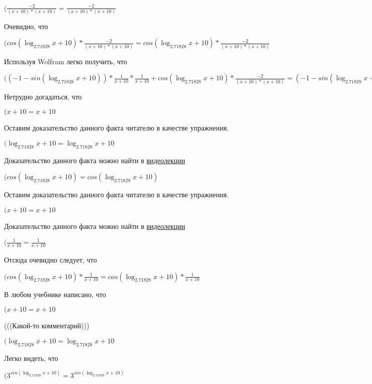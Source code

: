 \documentclass[12pt,a4paper,fleqn]{article}
\theoremstyle{definition}
\begin{document}
$(\frac{ -2 }{( x  +  10 ) * ( x  +  10 )}
 = \frac{ -2 }{( x  +  10 ) * ( x  +  10 )}
$

Очевидно, что

$(cos(\log_{ 2.71828 }{ x  +  10 }) * \frac{ -2 }{( x  +  10 ) * ( x  +  10 )}
 = cos(\log_{ 2.71828 }{ x  +  10 }) * \frac{ -2 }{( x  +  10 ) * ( x  +  10 )}
$

Используя Wolfram легко получить, что

$(( -1  - sin(\log_{ 2.71828 }{ x  +  10 })) * \frac{ 1 }{ x  +  10 }
 * \frac{ 1 }{ x  +  10 }
 + cos(\log_{ 2.71828 }{ x  +  10 }) * \frac{ -2 }{( x  +  10 ) * ( x  +  10 )}
 = ( -1  - sin(\log_{ 2.71828 }{ x  +  10 })) * \frac{ 1 }{ x  +  10 }
 * \frac{ 1 }{ x  +  10 }
 + cos(\log_{ 2.71828 }{ x  +  10 }) * \frac{ -2 }{( x  +  10 ) * ( x  +  10 )}
$

Нетрудно догадаться, что

$( x  +  10  =  x  +  10 $

Оставим доказательство данного факта читателю в качестве упражнения.

$(\log_{ 2.71828 }{ x  +  10 } = \log_{ 2.71828 }{ x  +  10 }$

Доказательство данного факта можно найти в \href{https://www.youtube.com/watch?v=dQw4w9WgXcQ}{видеолекции}

$(cos(\log_{ 2.71828 }{ x  +  10 }) = cos(\log_{ 2.71828 }{ x  +  10 })$

Оставим доказательство данного факта читателю в качестве упражнения.

$( x  +  10  =  x  +  10 $

Доказательство данного факта можно найти в \href{https://www.youtube.com/watch?v=dQw4w9WgXcQ}{видеолекции}

$(\frac{ 1 }{ x  +  10 }
 = \frac{ 1 }{ x  +  10 }
$

Отсюда очевидно следует, что

$(cos(\log_{ 2.71828 }{ x  +  10 }) * \frac{ 1 }{ x  +  10 }
 = cos(\log_{ 2.71828 }{ x  +  10 }) * \frac{ 1 }{ x  +  10 }
$

В любом учебнике написано, что

$( x  +  10  =  x  +  10 $

(((Какой-то комментарий)))

$(\log_{ 2.71828 }{ x  +  10 } = \log_{ 2.71828 }{ x  +  10 }$

Легко видеть, что

$({ 3 }^{sin(\log_{ 2.71828 }{ x  +  10 })} = { 3 }^{sin(\log_{ 2.71828 }{ x  +  10 })}$
\end{document}
